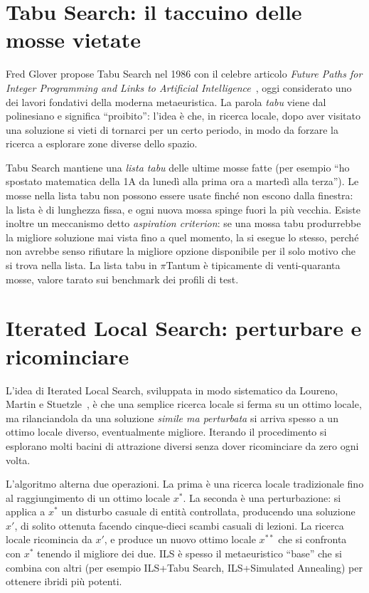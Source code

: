 \section{Tabu Search: il taccuino delle mosse vietate}

\begin{storiabox}
Fred Glover propose Tabu Search nel 1986 con il celebre
articolo \emph{Future Paths for Integer Programming and
Links to Artificial Intelligence}~\parencite{glover1986},
oggi considerato uno dei lavori fondativi della moderna
metaeuristica. La parola \emph{tabu} viene dal polinesiano e
significa ``proibito'': l'idea \`e che, in ricerca locale,
dopo aver visitato una soluzione si vieti di tornarci per un
certo periodo, in modo da forzare la ricerca a esplorare
zone diverse dello spazio.
\end{storiabox}

Tabu Search mantiene una \emph{lista tabu} delle ultime
mosse fatte (per esempio ``ho spostato matematica della 1A
da luned\`i alla prima ora a marted\`i alla terza''). Le
mosse nella lista tabu non possono essere usate finch\'e non
escono dalla finestra: la lista \`e di lunghezza fissa, e
ogni nuova mossa spinge fuori la pi\`u vecchia. Esiste
inoltre un meccanismo detto \emph{aspiration criterion}: se
una mossa tabu produrrebbe la migliore soluzione mai vista
fino a quel momento, la si esegue lo stesso, perch\'e non
avrebbe senso rifiutare la migliore opzione disponibile per
il solo motivo che si trova nella lista. La lista tabu in
$\pi$Tantum \`e tipicamente di venti-quaranta mosse, valore
tarato sui benchmark dei profili di test.

\section{Iterated Local Search: perturbare e ricominciare}

L'idea di Iterated Local Search, sviluppata in modo
sistematico da Loureno, Martin e
Stuetzle~\parencite{lourenco2003}, \`e che una semplice
ricerca locale si ferma su un ottimo locale, ma rilanciandola
da una soluzione \emph{simile ma perturbata} si arriva
spesso a un ottimo locale diverso, eventualmente migliore.
Iterando il procedimento si esplorano molti bacini di
attrazione diversi senza dover ricominciare da zero ogni
volta.

L'algoritmo alterna due operazioni. La prima \`e una ricerca
locale tradizionale fino al raggiungimento di un ottimo
locale $x^*$. La seconda \`e una perturbazione: si applica a
$x^*$ un disturbo casuale di entit\`a controllata,
producendo una soluzione $x'$, di solito ottenuta facendo
cinque-dieci scambi casuali di lezioni. La ricerca locale
ricomincia da $x'$, e produce un nuovo ottimo locale $x^{**}$
che si confronta con $x^*$ tenendo il migliore dei due. ILS
\`e spesso il metaeuristico ``base'' che si combina con
altri (per esempio ILS+Tabu Search, ILS+Simulated Annealing)
per ottenere ibridi pi\`u potenti.

